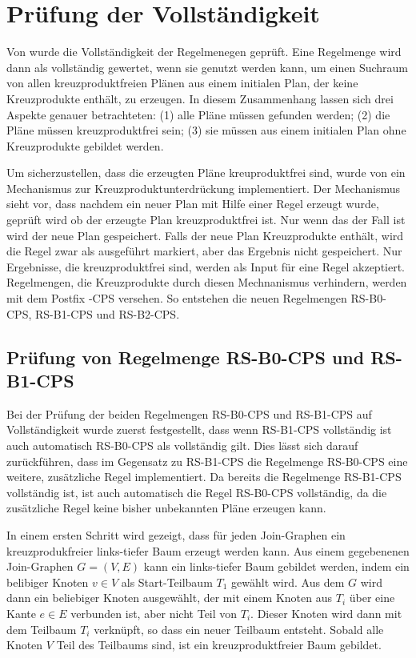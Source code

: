 \section{Prüfung der Vollständigkeit}

Von \cite{shanbhag2014optimizing} wurde die Vollständigkeit der Regelmenegen geprüft. Eine Regelmenge wird dann als vollständig gewertet, wenn sie genutzt werden kann, um einen Suchraum von allen kreuzproduktfreien Plänen aus einem initialen Plan, der keine Kreuzprodukte enthält, zu erzeugen. In diesem Zusammenhang lassen sich drei Aspekte genauer betrachteten: (1) alle Pläne müssen gefunden werden; (2) die Pläne müssen kreuzproduktfrei sein; (3) sie müssen aus einem initialen Plan ohne Kreuzprodukte gebildet werden.

Um sicherzustellen, dass die erzeugten Pläne kreuproduktfrei sind, wurde von \cite{shanbhag2014optimizing} ein Mechanismus zur Kreuzproduktunterdrückung implementiert. Der Mechanismus sieht vor, dass nachdem ein neuer Plan mit Hilfe einer Regel erzeugt wurde, geprüft wird ob der erzeugte Plan kreuzproduktfrei ist. Nur wenn das der Fall ist wird der neue Plan gespeichert. Falls der neue Plan Kreuzprodukte enthält, wird die Regel zwar als ausgeführt markiert, aber das Ergebnis nicht gespeichert. Nur Ergebnisse, die kreuzproduktfrei sind, werden als Input für eine Regel akzeptiert. Regelmengen, die Kreuzprodukte durch diesen Mechnanismus verhindern,  werden mit dem Postfix -CPS versehen. So entstehen die neuen Regelmengen RS-B0-CPS, RS-B1-CPS und RS-B2-CPS.






\subsection{Prüfung von Regelmenge RS-B0-CPS und RS-B1-CPS}

Bei der Prüfung der beiden Regelmengen RS-B0-CPS und RS-B1-CPS auf Vollständigkeit wurde zuerst festgestellt, dass wenn RS-B1-CPS vollständig ist auch automatisch RS-B0-CPS als vollständig gilt. Dies lässt sich darauf zurückführen, dass im Gegensatz zu RS-B1-CPS die Regelmenge RS-B0-CPS eine weitere, zusätzliche Regel implementiert. Da bereits die Regelmenge RS-B1-CPS vollständig ist, ist auch automatisch die Regel RS-B0-CPS vollständig, da die zusätzliche Regel keine bisher unbekannten Pläne erzeugen kann.

In einem ersten Schritt wird gezeigt, dass für jeden Join-Graphen ein kreuzprodukfreier links-tiefer Baum erzeugt werden kann. 
Aus einem gegebenenen Join-Graphen $G = (V, E)$ kann ein links-tiefer Baum gebildet werden, indem ein belibiger Knoten $v \in V$ als Start-Teilbaum $T_1$ gewählt wird. Aus dem $G$ wird dann ein beliebiger Knoten ausgewählt, der mit einem Knoten aus $T_i$ über eine Kante $e \in E$ verbunden ist, aber nicht Teil von $T_i$. Dieser Knoten wird dann mit dem Teilbaum $T_i$ verknüpft, so dass ein neuer Teilbaum entsteht. Sobald alle Knoten $V$ Teil des Teilbaums sind, ist ein kreuzproduktfreier Baum gebildet.

